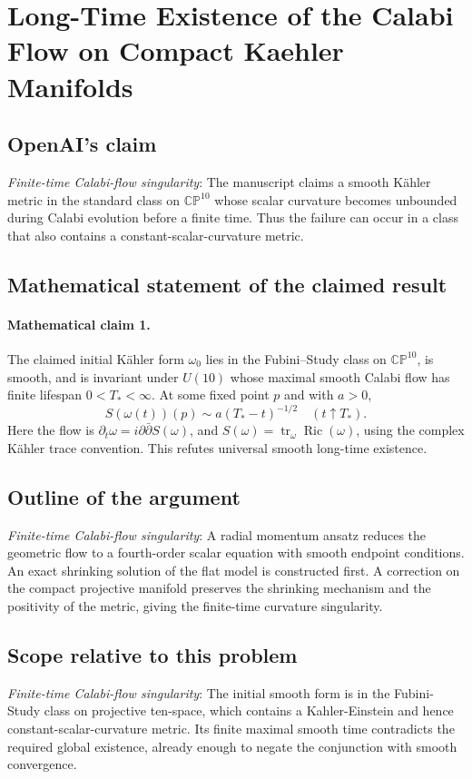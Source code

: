 \documentclass[11pt]{article}
\begin{document}
\section*{Long-Time Existence of the Calabi Flow on Compact Kaehler Manifolds}

\subsection{OpenAI's claim}
\textit{Finite-time Calabi-flow singularity}: The manuscript claims a smooth Kähler metric in the standard class on $\mathbb {CP}^{10}$ whose scalar curvature becomes unbounded during Calabi evolution before a finite time. Thus the failure can occur in a class that also contains a constant-scalar-curvature metric.

\subsection{Mathematical statement of the claimed result}
\paragraph{Mathematical claim 1.} The claimed initial K\"ahler form $\omega_0$ lies in the Fubini--Study class on $\mathbb{CP}^{10}$, is smooth, and is invariant under $U(10)$ whose maximal smooth Calabi flow has finite lifespan $0<T_*<\infty$. At some fixed point $p$ and with $a>0$, \[S(\omega(t))(p)\sim a(T_*-t)^{-1/2}\quad(t\uparrow T_*).\] Here the flow is $\partial_t\omega=i\partial\bar\partial S(\omega)$, and $S(\omega)=\operatorname{tr}_{\omega}\operatorname{Ric}(\omega)$, using the complex K\"ahler trace convention. This refutes universal smooth long-time existence.

\subsection{Outline of the argument}
\textit{Finite-time Calabi-flow singularity}: A radial momentum ansatz reduces the geometric flow to a fourth-order scalar equation with smooth endpoint conditions. An exact shrinking solution of the flat model is constructed first. A correction on the compact projective manifold preserves the shrinking mechanism and the positivity of the metric, giving the finite-time curvature singularity.

\subsection{Scope relative to this problem}
\textit{Finite-time Calabi-flow singularity}: The initial smooth form is in the Fubini-Study class on projective ten-space, which contains a Kahler-Einstein and hence constant-scalar-curvature metric. Its finite maximal smooth time contradicts the required global existence, already enough to negate the conjunction with smooth convergence.
\end{document}
